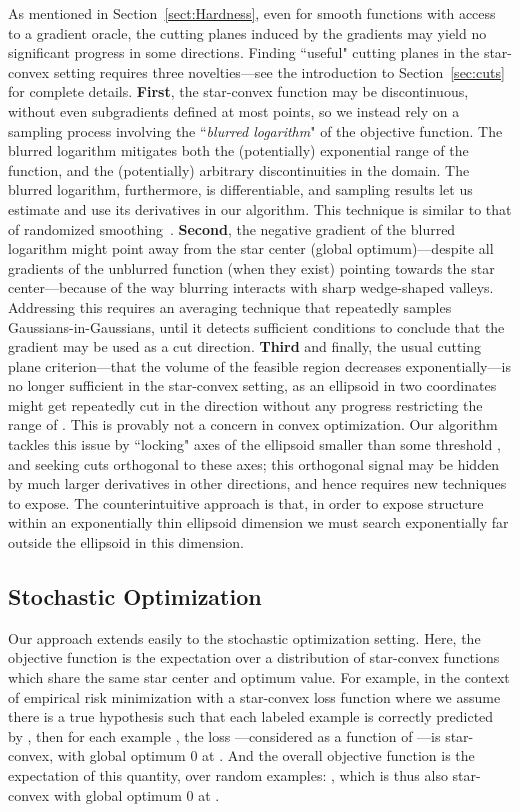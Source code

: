 \documentclass[11pt,letter]{article}
\numberwithin{nTheorems}{section}
\begin{document}
As mentioned in Section~\ref{sect:Hardness}, even for smooth functions with access to a gradient oracle, the cutting planes induced by the gradients may yield no significant progress in some directions.
Finding ``useful" cutting planes in the star-convex setting requires three novelties---see the introduction to Section~\ref{sec:cuts} for complete details. {\bf First}, the star-convex function may be discontinuous, without even subgradients defined at most points, so we instead rely on a sampling process involving the ``\emph{blurred logarithm}" of the objective function. The blurred logarithm mitigates both the (potentially) exponential range of the function, and the (potentially) arbitrary discontinuities in the domain. The blurred logarithm, furthermore, is differentiable, and sampling results let us estimate and use its derivatives in our algorithm. This technique is similar to that of randomized smoothing~\cite{Duchi:2012}. {\bf Second}, the negative gradient of the blurred logarithm might point away from the star center (global optimum)---despite all gradients of the unblurred function (when they exist) pointing towards the star center---because of the way blurring interacts with sharp wedge-shaped valleys. Addressing this requires an averaging technique that repeatedly samples Gaussians-in-Gaussians, until it detects sufficient conditions to conclude that the gradient may be used as a cut direction. {\bf Third} and finally, the usual cutting plane criterion---that the volume of the feasible region decreases exponentially---is no longer sufficient in the star-convex setting, as an ellipsoid in two coordinates  might get repeatedly cut in the  direction without any progress restricting the range of . This is provably not a concern in convex optimization. Our algorithm tackles this issue by ``locking" axes of the ellipsoid smaller than some threshold , and seeking cuts orthogonal to these axes; this orthogonal signal may be hidden by much larger derivatives in other directions, and hence requires new techniques to expose. The counterintuitive approach is that, in order to expose structure within an exponentially thin ellipsoid dimension we must search exponentially far outside the ellipsoid in this dimension.

\subsection{Stochastic Optimization}
Our approach extends easily to the stochastic optimization setting.
Here, the objective function is the expectation over a distribution of star-convex functions which share the same star center and optimum value.
For example, in the context of empirical risk minimization with a star-convex loss function  where we assume there is a true hypothesis  such that each labeled example is correctly predicted by , then for each example , the loss ---considered as a function of ---is star-convex, with global optimum 0 at . And the overall objective function is the expectation of this quantity, over random examples: , which is thus also star-convex with global optimum 0 at .
\end{document}
